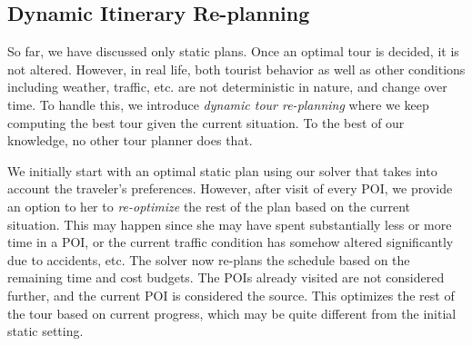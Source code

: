 \subsection{Dynamic Itinerary Re-planning}
\label{sec:dynamic}

So far, we have discussed only static plans.
Once an optimal tour is decided, it is not altered.
However, in real life, both tourist behavior as well as other conditions including weather, traffic, etc. are not deterministic in nature, and change over time.
To handle this, we introduce \emph{dynamic tour re-planning} where we keep computing the best tour given the current situation.
To the best of our knowledge, no other tour planner does that.

We initially start with an optimal static plan using our solver that takes into account the traveler's preferences.
However, after visit of every POI, we provide an option to her to \emph{re-optimize} the rest of the plan based on the current situation.
This may happen since she may have spent substantially less or more time in a POI, or the current traffic condition has somehow altered significantly due to accidents, etc.
%
The \trip solver now re-plans the schedule based on the remaining time and cost
budgets. The POIs already visited are not considered further, and the current POI is considered the source.
This optimizes the rest of the tour based on current progress, which may be quite different from the initial
static setting.

